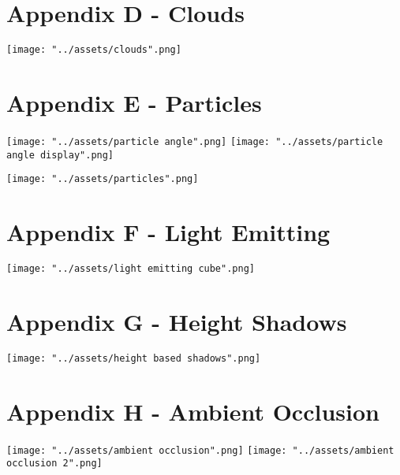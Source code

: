 \documentclass{book}
\begin{document}
    
\clearpage
\section{Appendix D - Clouds} \label{AppendixD}
\centering
\texttt{[image: "../assets/clouds".png]}

\clearpage
\section{Appendix E - Particles} \label{AppendixE}
\centering
\texttt{[image: "../assets/particle angle".png]}
\texttt{[image: "../assets/particle angle display".png]}
     
\texttt{[image: "../assets/particles".png]}

\clearpage
\section{Appendix F - Light Emitting} \label{AppendixF}
\centering
\texttt{[image: "../assets/light emitting cube".png]}  
    

\clearpage
\section{Appendix G - Height Shadows} \label{AppendixG}
\centering
\texttt{[image: "../assets/height based shadows".png]}    
    
\clearpage
\section{Appendix H - Ambient Occlusion} \label{AppendixH}
\centering
\texttt{[image: "../assets/ambient occlusion".png]}   
\texttt{[image: "../assets/ambient occlusion 2".png]}   
\end{document}
